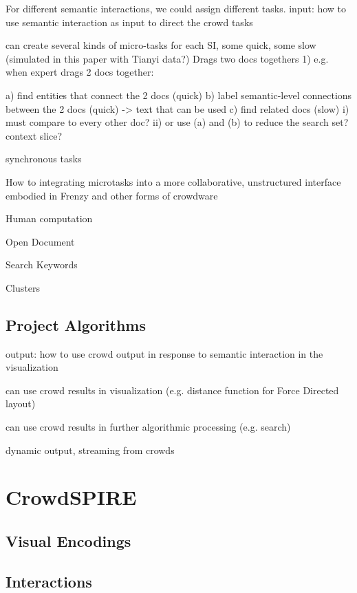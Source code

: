 \documentclass[journal]{vgtc}                %
\begin{document}
For different semantic interactions, we could assign different tasks.
input:  how to use semantic interaction as input to direct the crowd tasks


can create several kinds of micro-tasks for each SI, some quick, some slow  (simulated in this paper with Tianyi data?) \newline 
Drags two docs togethers
1) e.g. when expert drags 2 docs together:

a) find entities that connect the 2 docs (quick)
b) label semantic-level connections between the 2 docs (quick) -> text that can be used
c) find related docs (slow)
i) must compare to every other doc?
ii) or use (a) and (b) to reduce the search set?  context slice?\newline 


synchronous tasks

How to integrating microtasks into a more collaborative, unstructured interface embodied in Frenzy and other forms of crowdware


Human computation






Open Document

Search Keywords\newline 

Clusters \newline 


\subsection{Project Algorithms}

output:  how to use crowd output in response to semantic interaction in the visualization

can use crowd results in visualization (e.g. distance function for Force Directed layout)

can use crowd results in further algorithmic processing (e.g. search)

dynamic output, streaming from crowds


\section{CrowdSPIRE}

\subsection{Visual Encodings}

\subsection{Interactions}
\end{document}
